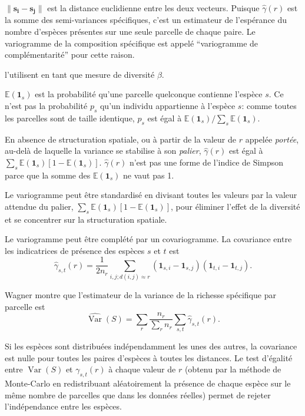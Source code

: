 \documentclass[
  11pt,
  french,
  a4paper,
  extrafontsizes,onecolumn,openright
  ]{memoir}
\begin{document}
\(\|\mathbf{s_i}-\mathbf{s_j}\|\) est la distance euclidienne entre les deux vecteurs.
Puisque \(\hat{\gamma}(r)\) est la somme des semi-variances spécifiques, c'est un estimateur de l'espérance du nombre d'espèces présentes sur une seule parcelle de chaque paire.
Le variogramme de la composition spécifique est appelé ``variogramme de complémentarité'' pour cette raison.

\textcite{Bacaro2007a} l'utilisent en tant que mesure de diversité \(\beta\).

\({\mathbb E}({\mathbf 1}_{s})\) est la probabilité qu'une parcelle quelconque contienne l'espèce \(s\).
Ce n'est pas la probabilité \(p_s\) qu'un individu appartienne à l'espèce \(s\):
comme toutes les parcelles sont de taille identique, \(p_s\) est égal à \({{\mathbb E}({\mathbf 1}_{s})}/{\sum_s{{\mathbb E}({\mathbf 1}_{s})}}\).

En absence de structuration spatiale, ou à partir de la valeur de \(r\) appelée \emph{portée}, au-delà de laquelle la variance se stabilise à son \emph{palier}, \(\hat{\gamma}(r)\) est égal à \(\sum_s{{\mathbb E}({\mathbf 1}_{s})[1-{\mathbb E}({\mathbf 1}_{s})]}\).
\(\hat{\gamma}(r)\) n'est pas une forme de l'indice de Simpson parce que la somme des \({\mathbb E}({\mathbf 1}_{s})\) ne vaut pas 1.

Le variogramme peut être standardisé en divisant toutes les valeurs par la valeur attendue du palier, \(\sum_s{{\mathbb E}({\mathbf 1}_{s})[1-{\mathbb E}({\mathbf 1}_{s})]}\), pour éliminer l'effet de la diversité et se concentrer sur la structuration spatiale.

Le variogramme peut être complété par un covariogramme.
La covariance entre les indicatrices de présence des espèces \(s\) et \(t\) est
\begin{equation}
  \label{eq:Estgammast}
  \hat{\gamma}_{s,t}(r) = \frac{1}{2 n_r} \sum_{i,j;d(i,j)\approx r}{({\mathbf 1}_{s,i} - {\mathbf 1}_{s,j})({\mathbf 1}_{t,i} - {\mathbf 1}_{t,j})}.
\end{equation}

Wagner montre que l'estimateur de la variance de la richesse spécifique par parcelle est
\begin{equation}
  \label{eq:VarS}
  \hat{\operatorname{Var}}(S) = \sum_r{\frac{n_r}{\sum_r{n_r}}} \sum_{s,t}{\hat{\gamma}_{s,t}(r)}.
\end{equation}

Si les espèces sont distribuées indépendamment les unes des autres, la covariance est nulle pour toutes les paires d'espèces à toutes les distances.
Le test d'égalité entre \(\operatorname{Var}(S)\) et \(\gamma_{s,t}(r)\) à chaque valeur de \(r\) (obtenu par la méthode de Monte-Carlo en redistribuant aléatoirement la présence de chaque espèce sur le même nombre de parcelles que dans les données réelles) permet de rejeter l'indépendance entre les espèces.
\end{document}
